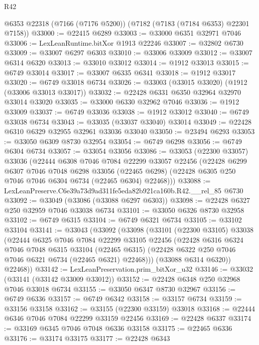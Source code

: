 \begin{lexlean}{R42}
\begin{coremodule}
{    @6353
    @22318
    (@7166 (@7176 @5200))
    (@7182 (@7183 (@7184 @6353) @22301 @7158))
@33000 := @22415 @6289
@33003 := @33000 @6351 @32971 @7046
@33006 := LexLeanRuntime.bitXor @1913 @22246
@33007 := @32802 @6730
@33009 := @33007 @6297 @6303
@33010 := @33006 @33009
@33012 := @33007 @6314 @6320
@33013 := @33010 @33012
@33014 := @1912 @33013
@33015 := @6749 @33014
@33017 := @33007 @6335 @6341
@33018 := @1912 @33017
@33020 := @6749 @33018 @6734
@33026 := @33003 (@33015 @33020) (@1912 (@33006 @33013 @33017))
@33032 := @22428 @6331 @6350 @32964 @32970 @33014 @33020
@33035 := @33000 @6330 @32962 @7046
@33036 := @1912 @33009
@33037 := @6749 @33036
@33038 := @1912 @33012
@33040 := @6749 @33038 @6734
@33043 := @33035 (@33037 @33040) @33014
@33049 := @22428 @6310 @6329 @32955 @32961 @33036 @33040
@33050 := @23494 @6293
@33053 := @33050 @6309 @8730 @32954
@33054 := @6749 @6298
@33056 := @6749 @6304 @6734
@33057 := @33054 @33056
@33086 := @33053
    (@22300 @33057)
    @33036
    (@22444
      @6308
      @7046
      @7084
      @22299
      @33057
      @22456
      (@22428
        @6299
        @6307
        @7046
        @7048
        @6298
        @33056
        (@22465 @6298)
        (@22428 @6305 @250 @7046 @7046 @6304 @6734 (@22465 @6304) @22468)))
@33088 := LexLeanPreserve.C6e39a73d9ad311fe5eda82b921ca160b.R42.__rel_85 @6730
@33092 := @33049 (@33086 (@33088 @6297 @6303))
@33098 := @22428 @6327 @250 @32959 @7046 @33038 @6734
@33101 := @33050 @6326 @8730 @32958
@33102 := @6749 @6315
@33104 := @6749 @6321 @6734
@33105 := @33102 @33104
@33141 := @33043
    (@33092
      (@33098
        (@33101
          (@22300 @33105)
          @33038
          (@22444
            @6325
            @7046
            @7084
            @22299
            @33105
            @22456
            (@22428
              @6316
              @6324
              @7046
              @7048
              @6315
              @33104
              (@22465 @6315)
              (@22428 @6322 @250 @7046 @7046 @6321 @6734 (@22465 @6321) @22468)))
          (@33088 @6314 @6320))
        @22468))
@33142 := LexLeanPreservation.prim_bitXor_u32
@33146 := @33032 (@33141 (@33142 @33009 @33012))
@33152 := @22428 @6348 @250 @32968 @7046 @33018 @6734
@33155 := @33050 @6347 @8730 @32967
@33156 := @6749 @6336
@33157 := @6749 @6342
@33158 := @33157 @6734
@33159 := @33156 @33158
@33162 := @33155 (@22300 @33159) @33018
@33168 := @22444 @6346 @7046 @7084 @22299 @33159 @22456
@33169 := @22428 @6337
@33174 := @33169 @6345 @7046 @7048 @6336 @33158
@33175 := @22465 @6336
@33176 := @33174 @33175
@33177 := @22428 @6343
}
\end{coremodule}
\end{lexlean}
